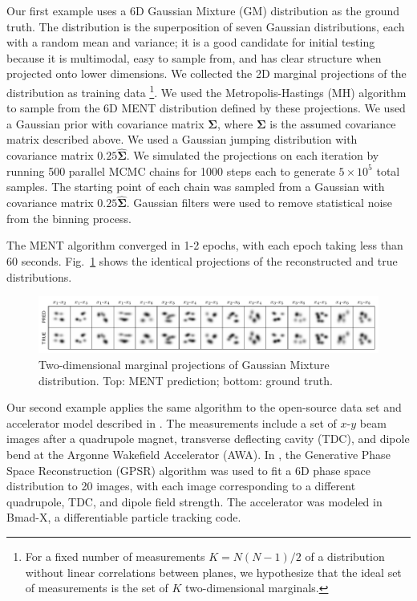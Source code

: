 \documentclass[%
    reprint,
    twocolumn,
    amsmath,
    amssymb,
    aps,
    prstab,
]{revtex4-2}
\begin{document}
Our first example uses a 6D Gaussian Mixture (GM) distribution as the ground truth. The distribution is the superposition of seven Gaussian distributions, each with a random mean and variance;  it is a good candidate for initial testing because it is multimodal, easy to sample from, and has clear structure when projected onto lower dimensions. We collected the 2D marginal projections of the distribution as training data \footnote{For a fixed number of measurements $K = N (N - 1) / 2$ of a distribution without linear correlations between planes, we hypothesize that the ideal set of measurements is the set of $K$ two-dimensional marginals.}. We used the Metropolis-Hastings (MH) algorithm to sample from the 6D MENT distribution defined by these projections. We used a Gaussian prior with covariance matrix $\bm{\Sigma}$, where $\bm{\Sigma}$ is the assumed covariance matrix described above. We used a Gaussian jumping distribution with covariance matrix $0.25 \hat{\bm{\Sigma}}$. We simulated the projections on each iteration by running 500 parallel MCMC chains for 1000 steps each to generate $5 \times 10^5$ total samples. The starting point of each chain was sampled from a Gaussian with covariance matrix $0.25 \hat{\bm{\Sigma}}$. Gaussian filters were used to remove statistical noise from the binning process. 

The MENT algorithm converged in 1-2 epochs, with each epoch taking less than 60 seconds. Fig.~\ref{fig:gmm} shows the identical projections of the reconstructed and true distributions.
%
\begin{figure}
    \centering
    \includegraphics[width=\linewidth]{fig_gmm_flat.pdf}
    \caption{Two-dimensional marginal projections of Gaussian Mixture distribution. Top: MENT prediction; bottom: ground truth.}
    \label{fig:gmm}
\end{figure}
%

Our second example applies the same algorithm to the open-source data set and accelerator model described in \cite{Roussel_2024_6d}. The measurements include a set of $x$-$y$ beam images after a quadrupole magnet, transverse deflecting cavity (TDC), and dipole bend at the Argonne Wakefield Accelerator (AWA). In \cite{Roussel_2024_6d}, the Generative Phase Space Reconstruction (GPSR) algorithm was used to fit a 6D phase space distribution to 20 images, with each image corresponding to a different quadrupole, TDC, and dipole field strength. The accelerator was modeled in Bmad-X, a differentiable particle tracking code. 
\end{document}

